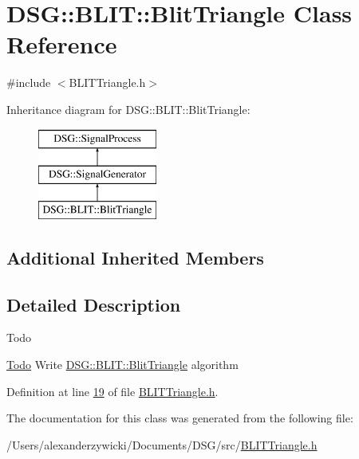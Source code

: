\hypertarget{class_d_s_g_1_1_b_l_i_t_1_1_blit_triangle}{\section{D\+S\+G\+:\+:B\+L\+I\+T\+:\+:Blit\+Triangle Class Reference}
\label{class_d_s_g_1_1_b_l_i_t_1_1_blit_triangle}
}


{\ttfamily \#include $<$B\+L\+I\+T\+Triangle.\+h$>$}

Inheritance diagram for D\+S\+G\+:\+:B\+L\+I\+T\+:\+:Blit\+Triangle\+:\begin{figure}[H]
\begin{center}
\leavevmode
\includegraphics[height=3.000000cm]{class_d_s_g_1_1_b_l_i_t_1_1_blit_triangle}
\end{center}
\end{figure}
\subsection*{Additional Inherited Members}


\subsection{Detailed Description}
\begin{DoxyRefDesc}{Todo}
\item[\hyperlink{todo__todo000004}{Todo}]Write \hyperlink{class_d_s_g_1_1_b_l_i_t_1_1_blit_triangle}{D\+S\+G\+::\+B\+L\+I\+T\+::\+Blit\+Triangle} algorithm \end{DoxyRefDesc}


Definition at line \hyperlink{_b_l_i_t_triangle_8h_source_l00019}{19} of file \hyperlink{_b_l_i_t_triangle_8h_source}{B\+L\+I\+T\+Triangle.\+h}.



The documentation for this class was generated from the following file\+:\begin{DoxyCompactItemize}
\item 
/\+Users/alexanderzywicki/\+Documents/\+D\+S\+G/src/\hyperlink{_b_l_i_t_triangle_8h}{B\+L\+I\+T\+Triangle.\+h}\end{DoxyCompactItemize}
